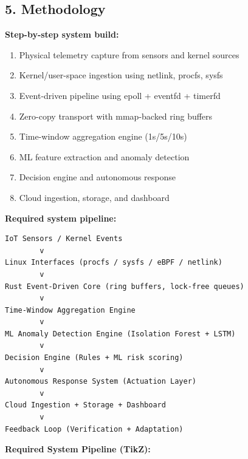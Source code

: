 \documentclass[11pt]{article}
\begin{document}
\subsection{5. Methodology}
\textbf{Step-by-step system build:}
\begin{enumerate}
    \item Physical telemetry capture from sensors and kernel sources
    \item Kernel/user-space ingestion using netlink, procfs, sysfs
    \item Event-driven pipeline using epoll + eventfd + timerfd
    \item Zero-copy transport with mmap-backed ring buffers
    \item Time-window aggregation engine (1s/5s/10s)
    \item ML feature extraction and anomaly detection
    \item Decision engine and autonomous response
    \item Cloud ingestion, storage, and dashboard
\end{enumerate}

\textbf{Required system pipeline:}
\begin{lstlisting}
IoT Sensors / Kernel Events
        v
Linux Interfaces (procfs / sysfs / eBPF / netlink)
        v
Rust Event-Driven Core (ring buffers, lock-free queues)
        v
Time-Window Aggregation Engine
        v
ML Anomaly Detection Engine (Isolation Forest + LSTM)
        v
Decision Engine (Rules + ML risk scoring)
        v
Autonomous Response System (Actuation Layer)
        v
Cloud Ingestion + Storage + Dashboard
        v
Feedback Loop (Verification + Adaptation)
\end{lstlisting}

\textbf{Required System Pipeline (TikZ):}
\begin{center}
\end{center}
\end{document}
